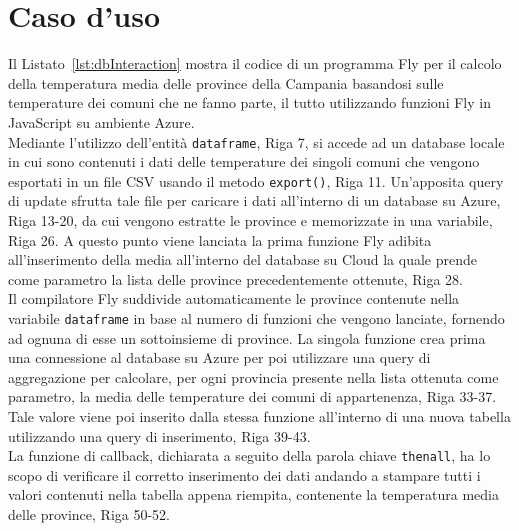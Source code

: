 \section{Caso d'uso}
Il Listato~\ref{lst:dbInteraction} mostra il codice di un programma Fly per il calcolo della temperatura media delle province della Campania basandosi sulle temperature dei comuni che ne fanno parte, il tutto utilizzando funzioni Fly in JavaScript su ambiente Azure.\\
Mediante l'utilizzo dell'entità \verb|dataframe|, Riga 7, si accede ad un database locale in cui sono contenuti i dati delle temperature dei singoli comuni che vengono esportati in un file CSV usando il metodo \verb|export()|, Riga 11. Un'apposita query di update sfrutta tale file per caricare i dati all'interno di un database su Azure, Riga 13-20, da cui vengono estratte le province e memorizzate in una variabile, Riga 26. A questo punto viene lanciata la prima funzione Fly adibita all'inserimento della media all'interno del database su Cloud la quale prende come parametro la lista delle province precedentemente ottenute, Riga 28.\\
Il compilatore Fly suddivide automaticamente le province contenute nella variabile \verb|dataframe| in base al numero di funzioni che vengono lanciate, fornendo ad ognuna di esse un sottoinsieme di province. La singola funzione crea prima una connessione al database su Azure per poi utilizzare una query di aggregazione per calcolare, per ogni provincia presente nella lista ottenuta come parametro, la media delle temperature dei comuni di appartenenza, Riga 33-37. Tale valore viene poi inserito dalla stessa funzione all'interno di una nuova tabella utilizzando una query di inserimento, Riga 39-43.\\
La funzione di callback, dichiarata a seguito della parola chiave \verb|thenall|, ha lo scopo di verificare il corretto inserimento dei dati andando a stampare tutti i valori contenuti nella tabella appena riempita, contenente la temperatura media delle province, Riga 50-52.\\

